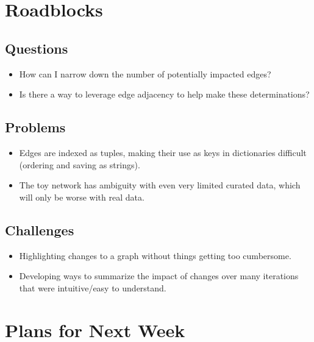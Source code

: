 \documentclass{weeklyreport}
\begin{document}
\pagebreak
\section*{Roadblocks}

\subsection*{Questions}

\begin{itemize}
	\item How can I narrow down the number of potentially impacted edges?
	\item Is there a way to leverage edge adjacency to help make these determinations?
\end{itemize}

\subsection*{Problems}

\begin{itemize}
	\item Edges are indexed as tuples, making their use as keys in dictionaries difficult (ordering and saving as strings).
	\item The toy network has ambiguity with even very limited curated data, which will only be worse with real data.
\end{itemize}

\subsection*{Challenges}

\begin{itemize}
    \item Highlighting changes to a graph without things getting too cumbersome.
	\item Developing ways to summarize the impact of changes over many iterations that were intuitive/easy to understand.
\end{itemize}

\section*{Plans for Next Week}
\end{document}
